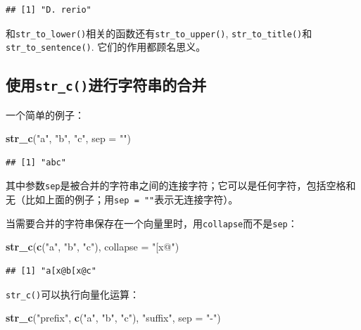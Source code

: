\documentclass[]{book}
\newenvironment{Shaded}{\begin{snugshade}}{\end{snugshade}}
\newcommand{\DataTypeTok}[1]{\textcolor[rgb]{0.13,0.29,0.53}{#1}}
\newcommand{\KeywordTok}[1]{\textcolor[rgb]{0.13,0.29,0.53}{\textbf{#1}}}
\newcommand{\NormalTok}[1]{#1}
\newcommand{\StringTok}[1]{\textcolor[rgb]{0.31,0.60,0.02}{#1}}
\begin{document}
\begin{verbatim}
## [1] "D. rerio"
\end{verbatim}

和\texttt{str\_to\_lower()}相关的函数还有\texttt{str\_to\_upper()}, \texttt{str\_to\_title()}和\texttt{str\_to\_sentence()}. 它们的作用都顾名思义。

\hypertarget{str_c}{%
\subsection{\texorpdfstring{使用\texttt{str\_c()}进行字符串的合并}{使用str\_c()进行字符串的合并}}\label{str_c}}

一个简单的例子：

\begin{Shaded}
\begin{Highlighting}[]
\KeywordTok{str_c}\NormalTok{(}\StringTok{"a"}\NormalTok{, }\StringTok{"b"}\NormalTok{, }\StringTok{"c"}\NormalTok{, }\DataTypeTok{sep =} \StringTok{""}\NormalTok{)}
\end{Highlighting}
\end{Shaded}

\begin{verbatim}
## [1] "abc"
\end{verbatim}

其中参数\texttt{sep}是被合并的字符串之间的连接字符；它可以是任何字符，包括空格和无（比如上面的例子；用\texttt{sep\ =\ ""}表示无连接字符）。

当需要合并的字符串保存在一个向量里时，用\texttt{collapse}而不是\texttt{sep}：

\begin{Shaded}
\begin{Highlighting}[]
\KeywordTok{str_c}\NormalTok{(}\KeywordTok{c}\NormalTok{(}\StringTok{"a"}\NormalTok{, }\StringTok{"b"}\NormalTok{, }\StringTok{"c"}\NormalTok{), }\DataTypeTok{collapse =} \StringTok{"[x@"}\NormalTok{)}
\end{Highlighting}
\end{Shaded}

\begin{verbatim}
## [1] "a[x@b[x@c"
\end{verbatim}

\texttt{str\_c()}可以执行向量化运算：

\begin{Shaded}
\begin{Highlighting}[]
\KeywordTok{str_c}\NormalTok{(}\StringTok{"prefix"}\NormalTok{, }\KeywordTok{c}\NormalTok{(}\StringTok{"a"}\NormalTok{, }\StringTok{"b"}\NormalTok{, }\StringTok{"c"}\NormalTok{), }\StringTok{"suffix"}\NormalTok{, }\DataTypeTok{sep =} \StringTok{"-"}\NormalTok{)}
\end{Highlighting}
\end{Shaded}
\end{document}
